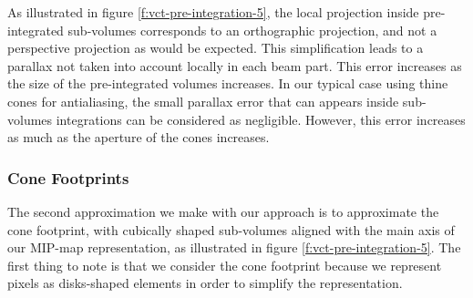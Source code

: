 As illustrated in figure \ref{f:vct-pre-integration-5}, the local projection inside pre-integrated sub-volumes corresponds to an orthographic projection, and not a perspective projection as would be expected. This simplification leads to a parallax not taken into account locally in each beam part. This error increases as the size of the pre-integrated volumes increases. In our typical case using thine cones for antialiasing, the small parallax error that can appears inside sub-volumes integrations can be considered as negligible. However, this error increases as much as the aperture of the cones increases.



\subsubsection{Cone Footprints}
The second approximation we make with our approach is to approximate the cone footprint, with cubically shaped sub-volumes aligned with the main axis of our MIP-map representation, as illustrated in figure \ref{f:vct-pre-integration-5}. The first thing to note is that we consider the cone footprint because we represent pixels as disks-shaped elements in order to simplify the representation.

